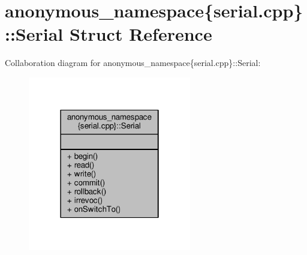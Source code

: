 \hypertarget{structanonymous__namespace_02serial_8cpp_03_1_1Serial}{\section{anonymous\-\_\-namespace\{serial.\-cpp\}\-:\-:Serial Struct Reference}
\label{structanonymous__namespace_02serial_8cpp_03_1_1Serial}
}


Collaboration diagram for anonymous\-\_\-namespace\{serial.\-cpp\}\-:\-:Serial\-:
\nopagebreak
\begin{figure}[H]
\begin{center}
\leavevmode
\includegraphics[width=202pt]{structanonymous__namespace_02serial_8cpp_03_1_1Serial__coll__graph}
\end{center}
\end{figure}
